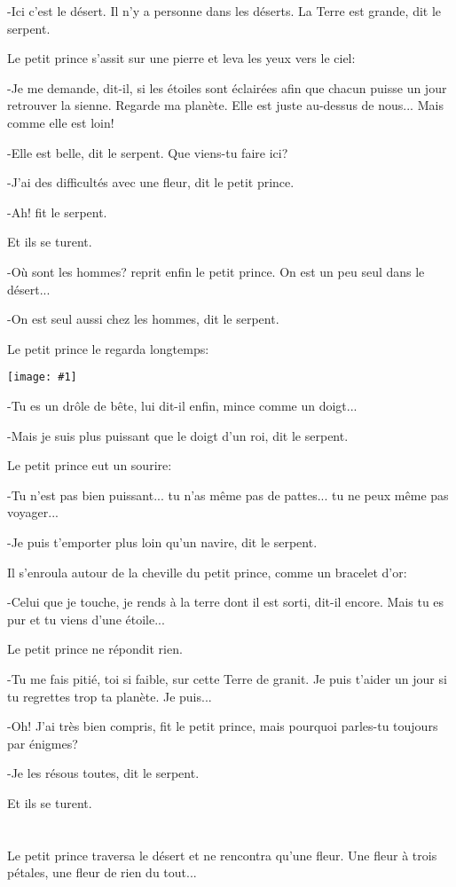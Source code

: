 \documentclass{report}
\newcommand{\parachapter}[2][]{\end{paracol}\chapter[#1]{#2}\begin{paracol}{2}}
\newcommand{\incpic}[1]{%
\end{paracol}
\begin{center}
    \texttt{[image: \#1]}
\end{center}
\begin{paracol}{2}}
\begin{document}
\begin{paracol}{2}
-Ici c'est le désert. Il n'y a personne dans les déserts. La Terre est grande, dit le serpent.

Le petit prince s'assit sur une pierre et leva les yeux vers le ciel:

-Je me demande, dit-il, si les étoiles sont éclairées afin que chacun puisse un jour retrouver la sienne. Regarde ma planète. Elle est juste au-dessus de nous... Mais comme elle est loin!

-Elle est belle, dit le serpent. Que viens-tu faire ici?

-J'ai des difficultés avec une fleur, dit le petit prince.

-Ah! fit le serpent.

Et ils se turent.

-Où sont les hommes? reprit enfin le petit prince. On est un peu seul dans le désert...

-On est seul aussi chez les hommes, dit le serpent.

Le petit prince le regarda longtemps:

\incpic{pic/image33.jpeg}

-Tu es un drôle de bête, lui dit-il enfin, mince comme un doigt...

-Mais je suis plus puissant que le doigt d'un roi, dit le serpent.

Le petit prince eut un sourire:

-Tu n'est pas bien puissant... tu n'as même pas de pattes... tu ne peux même pas voyager...

-Je puis t'emporter plus loin qu'un navire, dit le serpent.

Il s'enroula autour de la cheville du petit prince, comme un bracelet d'or:

-Celui que je touche, je rends à la terre dont il est sorti, dit-il encore. Mais tu es pur et tu viens d'une étoile...

Le petit prince ne répondit rien.

-Tu me fais pitié, toi si faible, sur cette Terre de granit. Je puis t'aider un jour si tu regrettes trop ta planète. Je puis...

-Oh! J'ai très bien compris, fit le petit prince, mais pourquoi parles-tu toujours par énigmes?

-Je les résous toutes, dit le serpent.

Et ils se turent.
\parachapter{} %
Le petit prince traversa le désert et ne rencontra qu'une fleur. Une fleur à trois pétales, une fleur de rien du tout...


\end{paracol}
\end{document}
